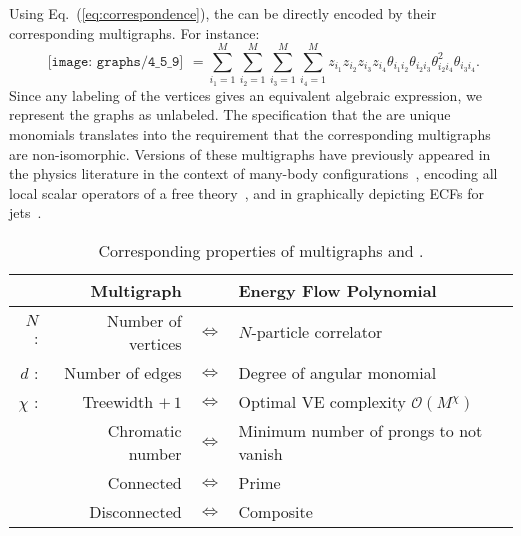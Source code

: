 \documentclass[letterpaper,11pt]{article}
\DeclareRobustCommand{\Eq}[1]{Eq.~(\ref{#1})}
\newcommand{\Bs}{\text{EFPs}\xspace}
\begin{document}
Using \Eq{eq:correspondence}, the \Bs can be directly encoded by their corresponding multigraphs. For instance:
\begin{equation}\label{eq:flyswatter}
\begin{gathered}
\texttt{[image: graphs/4\_5\_9]}
\end{gathered}
= \sum_{i_1=1}^M\sum_{i_2 = 1}^M \sum_{i_3 = 1}^M \sum_{i_4=1}^M  z_{i_1} z_{i_2} z_{i_3}z_{i_4}\theta_{i_1i_2}\theta_{i_2i_3}\theta_{i_2i_4}^2\theta_{i_3i_4}.
\end{equation}
Since any labeling of the vertices gives an equivalent algebraic expression, we represent the graphs as unlabeled.
%
The specification that the \Bs are unique monomials translates into the requirement that the corresponding multigraphs are non-isomorphic.
%
Versions of these multigraphs have previously appeared in the physics literature in the context of many-body configurations~\cite{dallot1992reduced, mandal2017determination}, encoding all local scalar operators of a free theory~\cite{Hogervorst:2014rta}, and in graphically depicting ECFs for jets~\cite{Moult:2016cvt,Larkoski:2017iuy}.

\begin{table}[t]
\centering
\begin{tabular}{|rrcl|}
\hline
& \textbf{Multigraph}  & & \textbf{Energy Flow Polynomial}  \\ \hline \hline
$N$ : & Number of vertices & $\Longleftrightarrow$ &  $N$-particle correlator \\ 
$d$ : & Number of edges &$\Longleftrightarrow$ & Degree of angular monomial \\ 
$\chi$ : & Treewidth $+\,1$  &$\Longleftrightarrow$ & Optimal VE complexity $\mathcal O(M^\chi)$  \\
& Chromatic number &$\Longleftrightarrow$ & Minimum number of prongs to not vanish\\
\hline
& Connected& $\Longleftrightarrow$ &Prime  \\
& Disconnected& $\Longleftrightarrow$ &Composite  \\
\hline
\end{tabular}
\caption{Corresponding properties of multigraphs and \Bs.}
\label{tab:correspondence}
\end{table}
\end{document}

